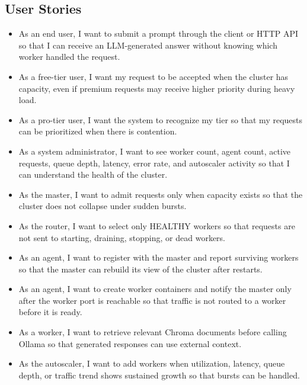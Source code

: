 \subsection{User Stories}
\begin{itemize}[leftmargin=1.5em]
  \item As an end user, I want to submit a prompt through the client or HTTP API so that I can receive an LLM-generated answer without knowing which worker handled the request.
  \item As a free-tier user, I want my request to be accepted when the cluster has capacity, even if premium requests may receive higher priority during heavy load.
  \item As a pro-tier user, I want the system to recognize my tier so that my requests can be prioritized when there is contention.
  \item As a system administrator, I want to see worker count, agent count, active requests, queue depth, latency, error rate, and autoscaler activity so that I can understand the health of the cluster.
  \item As the master, I want to admit requests only when capacity exists so that the cluster does not collapse under sudden bursts.
  \item As the router, I want to select only HEALTHY workers so that requests are not sent to starting, draining, stopping, or dead workers.
  \item As an agent, I want to register with the master and report surviving workers so that the master can rebuild its view of the cluster after restarts.
  \item As an agent, I want to create worker containers and notify the master only after the worker port is reachable so that traffic is not routed to a worker before it is ready.
  \item As a worker, I want to retrieve relevant Chroma documents before calling Ollama so that generated responses can use external context.
  \item As the autoscaler, I want to add workers when utilization, latency, queue depth, or traffic trend shows sustained growth so that bursts can be handled.
\end{itemize}

